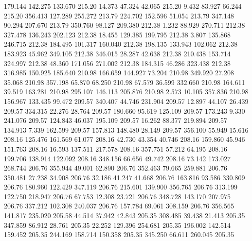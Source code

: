  179.144  142.275  133.670       215.20
  14.373   47.324   42.065       215.20
   9.432   83.927   66.244       215.20
 356.413  127.289  255.272       213.79
 224.702  152.596   51.054       213.79
 347.148   90.294  207.670       213.79
 350.760   98.127  209.380       212.38
   1.232   88.929  270.711       212.38
 327.478  136.243  202.123       212.38
  18.455  129.385  199.795       212.38
   3.807  135.868  246.715       212.38
 184.495  101.317  160.040       212.38
 198.135  133.943  102.062       212.38
 183.923   45.962  349.105       212.38
 346.015   28.287   42.638       212.38
 210.438  153.714  324.997       212.38
  48.360  171.056  271.002       212.38
 184.315   46.286  323.438       212.38
 316.985  150.925  185.640       210.98
 166.659  144.927   73.204       210.98
 349.920   27.208   35.068       210.98
 357.198   65.870   68.250       210.98
  67.579   36.599  332.660       210.98
 164.611   39.519  163.281       210.98
 295.107  146.113  205.876       210.98
   2.573   10.105  357.836       210.98
 156.967  133.435   99.472       209.57
 340.407   44.746  231.904       209.57
  12.897   44.107   26.439       209.57
 334.315   22.276   28.764       209.57
 180.660   95.619  125.109       209.57
 173.243    9.330  241.076       209.57
 124.843   46.037  195.109       209.57
  16.262   88.377  219.894       209.57
 134.913    7.339  162.599       209.57
 157.813  148.480   28.149       209.57
 356.100   55.949   15.616       208.16
 125.476  161.569   61.077       208.16
  42.730   43.354   40.746       208.16
 159.860   45.946  151.763       208.16
  16.593  137.511  217.578       208.16
 357.751   57.212   64.195       208.16
 199.706  138.914  122.092       208.16
 348.156   66.656   49.742       208.16
  73.142  173.027  268.744       206.76
 355.944   49.001   62.890       206.76
 352.463   79.665  259.881       206.76
 350.481   27.238   34.908       206.76
  32.186   41.247   41.668       206.76
 163.816   93.586  330.809       206.76
 180.960  122.429  347.119       206.76
 215.601  139.900  356.765       206.76
 313.199  122.750  218.947       206.76
  67.753   12.308   23.721       206.76
 348.728  143.170  207.975       206.76
 337.212  102.308  240.037       206.76
 157.784   69.061  308.159       206.76
 356.565  141.817  235.020       205.58
  44.514   37.942   42.843       205.35
 308.485   39.438   21.413       205.35
 347.859   86.912   28.761       205.35
  22.252  129.396  254.681       205.35
 196.002  142.514  159.452       205.35
 244.169  158.714  150.358       205.35
 345.250   66.611  260.045       205.35
